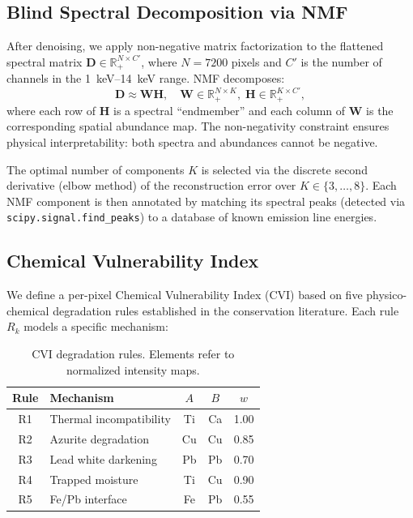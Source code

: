 \documentclass[twocolumn,11pt]{article}
\begin{document}
\subsection{Blind Spectral Decomposition via NMF}
\label{sec:nmf}

After denoising, we apply non-negative matrix factorization to the flattened
spectral matrix $\mathbf{D} \in \mathbb{R}_+^{N \times C'}$, where $N =
7200$ pixels and $C'$ is the number of channels in the
\SIrange{1}{14}{\kilo\electronvolt} range. NMF decomposes:
\begin{equation}
  \mathbf{D} \approx \mathbf{W}\mathbf{H}, \quad
  \mathbf{W} \in \mathbb{R}_+^{N \times K}, \;
  \mathbf{H} \in \mathbb{R}_+^{K \times C'},
\end{equation}
where each row of $\mathbf{H}$ is a spectral ``endmember'' and each column of
$\mathbf{W}$ is the corresponding spatial abundance map. The non-negativity
constraint ensures physical interpretability: both spectra and abundances
cannot be negative.

The optimal number of components $K$ is selected via the discrete second
derivative (elbow method) of the reconstruction error over $K \in
\{3, \ldots, 8\}$. Each NMF component is then annotated by matching its
spectral peaks (detected via \texttt{scipy.signal.find\_peaks}) to a database
of known emission line energies.

\subsection{Chemical Vulnerability Index}
\label{sec:cvi}

We define a per-pixel Chemical Vulnerability Index (CVI) based on five
physico-chemical degradation rules established in the conservation
literature. Each rule $R_k$ models a specific mechanism:

\begin{table}[h]
\centering
\caption{CVI degradation rules. Elements refer to normalized intensity maps.}
\label{tab:cvi_rules}
\small
\begin{tabular}{@{}clccc@{}}
\toprule
Rule & Mechanism & $A$ & $B$ & $w$ \\
\midrule
R1 & Thermal incompatibility & Ti & Ca & 1.00 \\
R2 & Azurite degradation & Cu & Cu & 0.85 \\
R3 & Lead white darkening & Pb & Pb & 0.70 \\
R4 & Trapped moisture & Ti & Cu & 0.90 \\
R5 & Fe/Pb interface & Fe & Pb & 0.55 \\
\bottomrule
\end{tabular}
\end{table}
\end{document}
